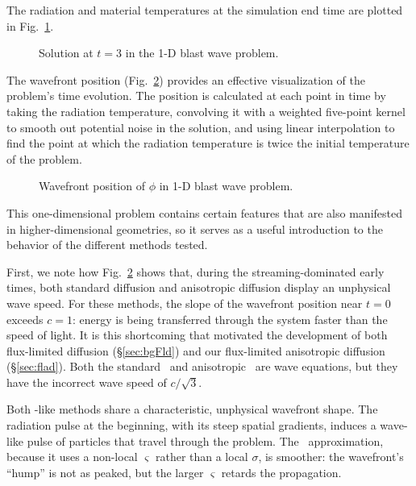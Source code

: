 The radiation and material temperatures at the simulation end time are plotted
in Fig.~\ref{fig:1dblastTemp}.

\begin{figure}[htb]
  \centering\small
  \centering
  \caption{Solution at $t=3$ in the 1-D blast wave problem.}
  \label{fig:1dblastTemp}
\end{figure}

The wavefront position (Fig.~\ref{fig:1dblastWavefront}) provides an effective
visualization of the problem's time evolution. The position is calculated at
each point in time by taking the radiation temperature, convolving it with a
weighted five-point kernel to smooth out potential noise in the solution, and
using linear interpolation to find the point at which the radiation temperature
is twice the initial temperature of the problem.

\begin{figure}[htb]
  \centering\small
  
  \caption{Wavefront position of $\phi$ in 1-D blast wave problem.}
  \label{fig:1dblastWavefront}
\end{figure}

This one-dimensional problem contains certain features that are also manifested
in higher-dimensional geometries, so it serves as a useful introduction to the
behavior of the different methods tested.

First, we note how Fig.~\ref{fig:1dblastWavefront}
shows that, during the streaming-dominated early times, both standard diffusion
and anisotropic diffusion display an unphysical wave speed. For these methods,
the slope of the wavefront position near $t=0$ exceeds $c=1$: energy is being
transferred through the system faster than the speed of light. It is this
shortcoming that motivated the development of both flux-limited diffusion
(\S\ref{sec:bgFld}) and our flux-limited anisotropic diffusion
(\S\ref{sec:flad}). Both the standard \Pone\ and anisotropic \Pone\ are wave
equations, but they have the incorrect wave speed of $c/\sqrt{3}$.

Both \Pone-like methods share a characteristic, unphysical wavefront shape.
The radiation pulse at the beginning, with its steep spatial gradients,
induces a wave-like pulse of particles that travel through the problem. The
\APone\ approximation, because it uses a non-local
$\varsigma$ rather than a local $\sigma$, is smoother: the wavefront's ``hump''
is not as peaked, but the larger $\varsigma$ retards the propagation.

